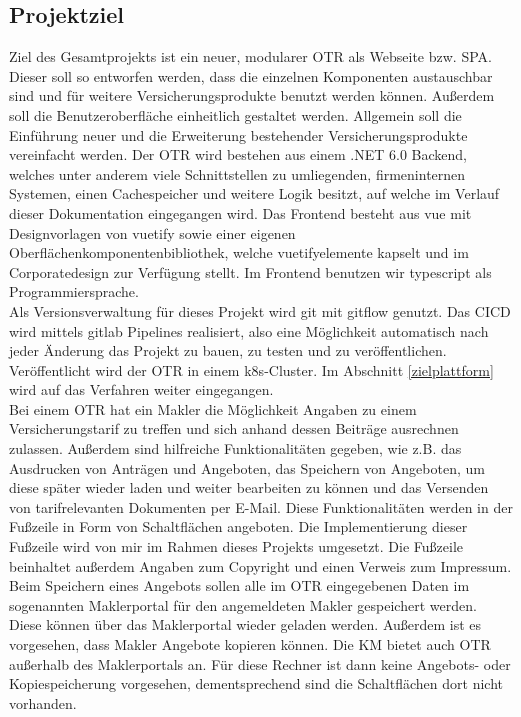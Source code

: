 \subsection{Projektziel}
\label{projektziel}
Ziel des Gesamtprojekts ist ein neuer, modularer \ac{OTR} als Webseite bzw. \ac{SPA}. Dieser soll so entworfen werden, dass die einzelnen Komponenten austauschbar sind und für weitere Versicherungsprodukte benutzt werden können. Außerdem soll die Benutzeroberfläche einheitlich gestaltet werden. Allgemein soll die Einführung neuer und die Erweiterung bestehender Versicherungsprodukte vereinfacht werden. Der \ac{OTR} wird bestehen aus einem .NET 6.0 Backend, welches unter anderem viele Schnittstellen zu umliegenden, firmeninternen Systemen, einen Cachespeicher und weitere Logik besitzt, auf welche im Verlauf dieser Dokumentation eingegangen wird. Das Frontend besteht aus \gls{vue} mit Designvorlagen von \gls{vuetify} sowie einer eigenen Oberflächenkomponentenbibliothek, welche \gls{vuetify}elemente kapselt und im Corporatedesign zur Verfügung stellt. Im Frontend benutzen wir \gls{typescript} als Programmiersprache.\\
Als Versionsverwaltung für dieses Projekt wird \gls{git} mit \gls{gitflow} genutzt. Das \ac{CICD} wird mittels \gls{gitlab} Pipelines realisiert, also eine Möglichkeit automatisch nach jeder Änderung das Projekt zu bauen, zu testen und zu veröffentlichen. Veröffentlicht wird der \ac{OTR} in einem \gls{k8s}-Cluster. Im Abschnitt \ref{zielplattform} wird auf das Verfahren weiter eingegangen.
\\
Bei einem \ac{OTR} hat ein Makler die Möglichkeit Angaben zu einem Versicherungstarif zu treffen und sich anhand dessen Beiträge ausrechnen zulassen. Außerdem sind hilfreiche Funktionalitäten gegeben, wie z.B. das Ausdrucken von Anträgen und Angeboten, das Speichern von Angeboten, um diese später wieder laden und weiter bearbeiten zu können und das Versenden von tarifrelevanten Dokumenten per E-Mail. Diese Funktionalitäten werden in der Fußzeile in Form von Schaltflächen angeboten. Die Implementierung dieser Fußzeile wird von mir im Rahmen dieses Projekts umgesetzt. Die Fußzeile beinhaltet außerdem Angaben zum Copyright und einen Verweis zum Impressum.
\\

Beim Speichern eines Angebots sollen alle im \ac{OTR} eingegebenen Daten im sogenannten Maklerportal für den angemeldeten Makler gespeichert werden. Diese können über das Maklerportal wieder geladen werden. Außerdem ist es vorgesehen, dass Makler Angebote kopieren können.
Die \ac{KM} bietet auch \ac{OTR} außerhalb des Maklerportals an. Für diese Rechner ist dann keine Angebots- oder Kopiespeicherung vorgesehen, dementsprechend sind die Schaltflächen dort nicht vorhanden. \\

